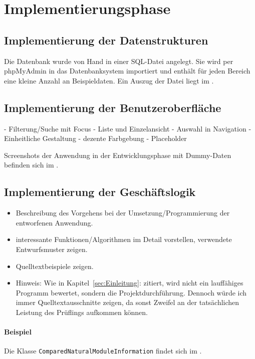 \section{Implementierungsphase} 
\label{sec:Implementierungsphase}

\subsection{Implementierung der Datenstrukturen}
\label{sec:ImplementierungDatenstrukturen}
Die Datenbank wurde von Hand in einer \acs{SQL}-Datei angelegt. Sie wird per
phpMyAdmin in das Datenbanksystem importiert und enthält für jeden Bereich eine
kleine Anzahl an Beispieldaten. Ein Auszug der Datei liegt im
.


\subsection{Implementierung der Benutzeroberfläche}
\label{sec:ImplementierungBenutzeroberflaeche}

- Filterung/Suche mit Focus
- Liste und Einzelansicht
- Auswahl in Navigation
- Einheitliche Gestaltung
- dezente Farbgebung
- Placeholder

Screenshots der Anwendung in der Entwicklungsphase mit Dummy-Daten befinden sich
im .


\subsection{Implementierung der Geschäftslogik}
\label{sec:ImplementierungGeschaeftslogik}

\begin{itemize}
	\item Beschreibung des Vorgehens bei der Umsetzung/Programmierung der entworfenen Anwendung.
	\item \Ggfs interessante Funktionen/Algorithmen im Detail vorstellen, verwendete Entwurfsmuster zeigen.
	\item Quelltextbeispiele zeigen.
	\item Hinweis: Wie in Kapitel~\ref{sec:Einleitung}:  zitiert, wird nicht ein lauffähiges Programm bewertet, sondern die Projektdurchführung. Dennoch würde ich immer Quelltextausschnitte zeigen, da sonst Zweifel an der tatsächlichen Leistung des Prüflings aufkommen können.
\end{itemize}

\paragraph{Beispiel}
Die Klasse \texttt{Com\-par\-ed\-Na\-tu\-ral\-Mo\-dule\-In\-for\-ma\-tion} findet sich im .
